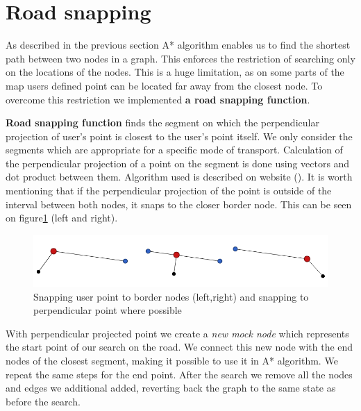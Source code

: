 \section{Road snapping}
As described in the previous section A* algorithm enables us to find the shortest path between two nodes in a graph. This enforces the restriction of searching only on the locations of the nodes. This is a huge limitation, as on some parts of the map users defined point can be located far away from the closest node. To overcome this restriction we implemented \textbf{a road snapping function}.
\par
\textbf{Road snapping function} finds the segment on which the perpendicular projection of user's point is closest to the user's point itself. We only consider the segments which are appropriate for a specific mode of transport. Calculation of the perpendicular projection of a point on the segment is done using vectors and dot product between them. Algorithm used is described on website (\cite{notmagi}). It is worth mentioning that if the perpendicular projection of the point is outside of the interval between both nodes, it snaps to the closer border node. This can be seen on figure\ref{fig:db_snap} (left and right).

\begin{figure}[h]
\centering
\includegraphics[width=0.9\linewidth]{../pictures/snap_points.png}
\caption{Snapping user point to border nodes (left,right) and snapping to perpendicular point where possible}
\label{fig:db_snap}
\end{figure}

With perpendicular projected point we create a \textit{new mock node} which represents the start point of our search on the road. We connect this new node with the end nodes of the closest segment, making it possible to use it in A* algorithm. We repeat the same steps for the end point. After the search we remove all the nodes and edges we additional added, reverting back the graph to the same state as before the search.

